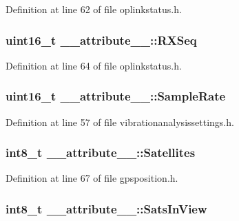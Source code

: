 \-Definition at line 62 of file oplinkstatus.\-h.

\hypertarget{struct____attribute_____ad9013a32efca09c14c12854a620f0d3f}{
\subsubsection[{\-R\-X\-Seq}]{\setlength{\rightskip}{0pt plus 5cm}uint16\-\_\-t {\bf \-\_\-\-\_\-attribute\-\_\-\-\_\-\-::\-R\-X\-Seq}}}\label{struct____attribute_____ad9013a32efca09c14c12854a620f0d3f}


\-Definition at line 64 of file oplinkstatus.\-h.

\hypertarget{struct____attribute_____aea851ba15c8d4ac48cb158fddfcfbc2c}{
\subsubsection[{\-Sample\-Rate}]{\setlength{\rightskip}{0pt plus 5cm}uint16\-\_\-t {\bf \-\_\-\-\_\-attribute\-\_\-\-\_\-\-::\-Sample\-Rate}}}\label{struct____attribute_____aea851ba15c8d4ac48cb158fddfcfbc2c}


\-Definition at line 57 of file vibrationanalysissettings.\-h.

\hypertarget{struct____attribute_____a78f0a91a8b03a42479f9222fa6173fb2}{
\subsubsection[{\-Satellites}]{\setlength{\rightskip}{0pt plus 5cm}int8\-\_\-t {\bf \-\_\-\-\_\-attribute\-\_\-\-\_\-\-::\-Satellites}}}\label{struct____attribute_____a78f0a91a8b03a42479f9222fa6173fb2}


\-Definition at line 67 of file gpsposition.\-h.

\hypertarget{struct____attribute_____a326e9a329a899d5fcabc1c4d58ccb26b}{
\subsubsection[{\-Sats\-In\-View}]{\setlength{\rightskip}{0pt plus 5cm}int8\-\_\-t {\bf \-\_\-\-\_\-attribute\-\_\-\-\_\-\-::\-Sats\-In\-View}}}\label{struct____attribute_____a326e9a329a899d5fcabc1c4d58ccb26b}


